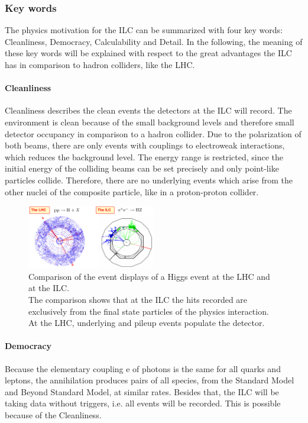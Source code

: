 \subsubsection{Key words}
The physics motivation for the ILC can be summarized with four key words: Cleanliness, Democracy, Calculability and Detail.\cite[p. 2-5]{TDR2}
In the following, the meaning of these key words will be explained with respect to the great advantages the ILC has in comparison to hadron colliders, like the LHC.
\paragraph{Cleanliness}
Cleanliness describes the clean events the detectors at the ILC will record.
The environment is clean because of the small background levels and therefore small detector occupancy in comparison to a hadron collider.
Due to the polarization of both beams, there are only events with couplings to electroweak interactions, which reduces the background level.
The energy range is restricted, since the initial energy of the colliding beams can be set precisely and only point-like particles collide.
Therefore, there are no underlying events which arise from the other nuclei of the composite particle, like in a proton-proton collider.

\begin{figure}
\centering
\includegraphics[width=0.5\textwidth]{Figures/Cleanliness.png}
\caption[Clean environment at the ILC]{Comparison of the event displays of a Higgs event at the  LHC and at the ILC.\cite[p. 4]{ILCPhysics_Thomson}\\
The comparison shows that at the ILC the hits recorded are exclusively from the final state particles of the physics interaction.
At the LHC, underlying and pileup events populate the detector.}
\label{fig:Cleanliness}
\end{figure}

\paragraph{Democracy}
Because the elementary coupling e of photons is the same for all quarks and leptons, the \electron \positron annihilation produces pairs of all species, from the Standard Model and Beyond Standard Model, at similar rates.
Besides that, the ILC will be taking data without triggers, i.e. all events will be recorded.
This is possible because of the Cleanliness.
